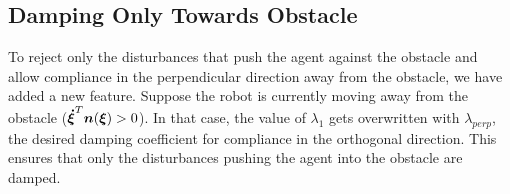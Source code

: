 \documentclass[conference]{IEEEtran}
\begin{document}


\subsection{Damping Only Towards Obstacle} \label{sec:damping_only_toward}
To reject only the disturbances that push the agent against the obstacle and allow compliance in the perpendicular direction away from the obstacle, we have added a new feature. Suppose the robot is currently moving away from the obstacle ($\boldsymbol{\dot\xi}^T \boldsymbol{n}(\boldsymbol{\xi}) > 0$). In that case, the value of $\lambda_1$ gets overwritten with $\lambda_{perp}$, the desired damping coefficient for compliance in the orthogonal direction. This ensures that only the disturbances pushing the agent into the obstacle are damped. \\
\end{document}

